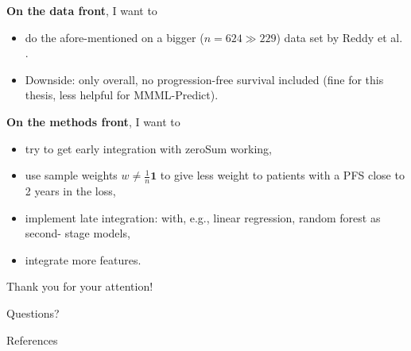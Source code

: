 \documentclass[10pt, aspectratio=169]{beamer}
\begin{document}
\begin{frame}{}
  \textbf{On the data front}, I want to  
  \begin{itemize}
    \item do the afore-mentioned on a \alert{bigger ($n = 624 \gg 229$) data set} by Reddy 
      et al. \autocite{reddy17}. 
    \item Downside: only overall, no progression-free survival included (fine 
      for this thesis, less helpful for MMML-Predict).
  \end{itemize}

  \textbf{On the methods front}, I want to 
  \begin{itemize}
    \item try to get \alert{early integration} with zeroSum working,
    \item use sample weights $w \neq \frac{1}{n} \mathbf{1}$ to give less weight to patients with 
      a PFS close to 2 years in the loss,
    \item implement \alert{late integration}: with, e.g., linear regression, random forest as second-
      stage models,
    \item integrate more features.
  \end{itemize}
\end{frame}

\begin{frame}[standout]
  Thank you for your attention! \par Questions?
\end{frame}

\appendix

\begin{frame}[allowframebreaks]{References}
  \printbibliography
\end{frame}
\end{document}
